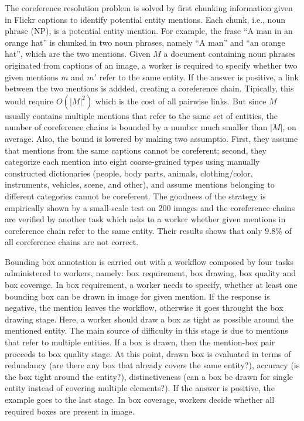 The coreference resolution problem is solved by first chunking
information given in Flickr captions to identify potential entity
mentions. Each chunk, i.e., noun phrase (NP), is a potential entity
mention. For example, the frase ``A man in an orange hat'' is chunked
in two noun phrases, namely ``A man'' and ``an orange hat'', which are
the two mentions. Given $M$ a document containing noun phrases
originated from captions of an image, a worker is required to specify
whether two given mentions $m$ and $m'$ refer to the same entity. If
the answer is positive, a link between the two mentions is addded,
creating a coreference chain. Tipically, this would require $O(|M|^2)$
which is the cost of all pairwise links. But since $M$ usually
contains multiple mentions that refer to the same set of entities, the
number of coreference chains is bounded by a number much smaller than
$|M|$, on average. Also, the bound is lowered by making two assumptio.
First, they assume that mentions from the same captions cannot be
coreferent; second, they categorize each mention into eight
coarse-grained types using manually constructed dictionaries (people,
body parts, animals, clothing/color, instruments, vehicles, scene, and
other), and assume mentions belonging to different categories cannot
be coreferent. The goodnees of the strategy is empirically shown by a
small-scale test on 200 images and the coreference chains are verified
by another task which asks to a worker whether given mentions in
coreference chain refer to the same entity. Their results shows that
only $9.8\%$ of all coreference chains are not correct.

Bounding box annotation is carried out with a workflow composed by
four tasks administered to workers, namely: box requirement, box
drawing, box quality and box coverage. In box requirement, a worker
needs to specify, whether at least one bounding box can be drawn in
image for given mention. If the response is negative, the mention
leaves the workflow, otherwise it goes throught the box drawing stage.
Here, a worker should draw a box as tight as possible around the
mentioned entity. The main source of difficulty in this stage is due
to mentions that refer to multiple entities. If a box is drawn, then
the mention-box pair proceeds to box quality stage. At this point,
drawn box is evaluated in terms of redundancy (are there any box that
already covers the same entity?), accuracy (is the box tight around
the entity?), distinctiveness (can a box be drawn for single entity
instead of covering multiple elements?). If the answer is positive,
the example goes to the last stage. In box coverage, workers decide
whether all required boxes are present in image. 

